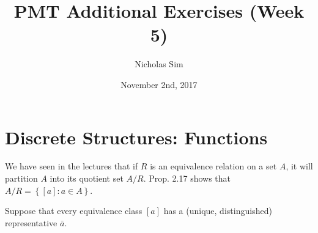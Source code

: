 \documentclass[10pt,a4paper]{article}
\begin{document}
\title{PMT Additional Exercises (Week 5)}
\author{Nicholas Sim}
\date{November 2nd, 2017}
\maketitle{}


\section{Discrete Structures: Functions}

We have seen in the lectures that if \( R \) is an equivalence relation on 
a set \( A \), it will partition \( A \) into its quotient set \( A / R \).
Prop. 2.17 shows that \( A / R = \left\{ [a] : a \in A \right\} \).

Suppose that every equivalence class \( [a] \) has a 
(unique, distinguished) representative \( \bar{a} \).
\end{document}
